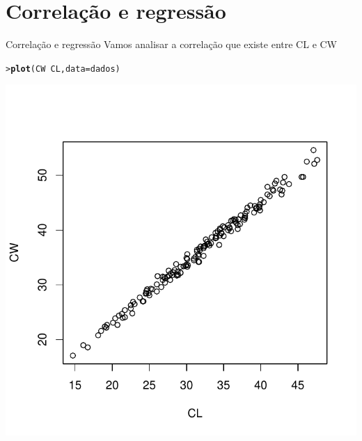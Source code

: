 \documentclass[10pt]{beamer}\usepackage{graphicx, color}
\makeatletter
\newcommand{\hlfunctioncall}[1]{\textcolor[rgb]{0,0,0.545098039215686}{\textbf{#1}}}%
\newenvironment{kframe}{%
 \def\at@end@of@kframe{}%
 \ifinner\ifhmode%
  \def\at@end@of@kframe{\end{minipage}}%
  \begin{minipage}{\columnwidth}%
 \fi\fi%
 \def\FrameCommand##1{\hskip\@totalleftmargin \hskip-\fboxsep
 \colorbox{shadecolor}{##1}\hskip-\fboxsep
     \hskip-\linewidth \hskip-\@totalleftmargin \hskip\columnwidth}%
 \MakeFramed {\advance\hsize-\width
   \@totalleftmargin\z@ \linewidth\hsize
   \@setminipage}}%
 {\par\unskip\endMakeFramed%
 \at@end@of@kframe}
\newenvironment{knitrout}{}{} %
\makeatother
\begin{document}
\section{Correlação e regressão}

\begin{frame}[fragile=singleslide]{Correlação e regressão}
Vamos analisar a correlação que existe entre CL e CW
\begin{knitrout}\small
{}\color{fgcolor}\begin{kframe}
\begin{alltt}
> \hlfunctioncall{plot}(CW ~ CL, data = dados)
\end{alltt}
\end{kframe}

{\centering \includegraphics[width=.6\textwidth]{figure/unnamed-chunk-12} 

}


\end{knitrout}

\end{frame}
\end{document}

